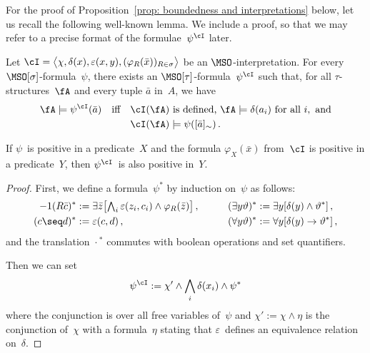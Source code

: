 \documentclass{LMCS}
\begin{document}
For the proof of Proposition~\ref{prop: boundedness and interpretations} below,
let us recall the following well-known lemma.
We include a proof, so that we may refer to a
precise format of the formulae~$\psi^\cI$ later.
\begin{lem}\label{lem:interpretations}
Let $\cI = \bigl\langle\chi, \delta(x),\varepsilon(x,y),(\varphi_R(\bar x))_{R \in \sigma}\bigr\rangle$
be an $\MSO$-interpretation.
For every $\MSO[\sigma]$-formula~$\psi$,
there exists an $\MSO[\tau]$-formula~$\psi^\cI$ such that,
for all $\tau$-structures~$\fA$ and every tuple $\bar a$ in~$A$, we have
\begin{align*}
  \fA \models \psi^\cI(\bar a)
  \quad\text{iff}\quad
  &\cI(\fA) \text{ is defined, }
    \fA \models \delta(a_i) \text{ for all } i, \text{ and}\\
  &\cI(\fA) \models \psi([\bar a]_\sim)\,. 
\end{align*}

If $\psi$~is positive in a predicate~$X$ and the
formula $\varphi_X(\bar x)$ from~$\cI$ is positive
in a predicate~$Y$, then $\psi^\cI$~is also positive in~$Y$.
\end{lem}
\begin{proof}
First, we define a formula~$\psi^*$ by induction on~$\psi$ as follows\?:
\begin{alignat*}{-1}
  (R\bar c)^* &:= \textstyle\exists\bar z\bigl[\bigwedge_i \varepsilon(z_i, c_i) \land \varphi_R(\bar z)\bigr]\,,
  &\qquad
  (\exists y\vartheta)^* &:= \exists y[\delta(y) \land \vartheta^*]\,, \\
  (c\seq d)^* &:= \varepsilon(c,d)\,,
  &\qquad
  (\forall y\vartheta)^* &:= \forall y[\delta(y) \to \vartheta^*]\,,
\end{alignat*}
and the translation ${}\cdot{}^*$ commutes with boolean operations and set quantifiers.

Then we can set
\begin{align*}
  \psi^\cI := \chi' \land \bigwedge_i \delta(x_i) \land \psi^*
\end{align*}
where
the conjunction is over all free variables of~$\psi$ and
$\chi' := \chi \land \eta$ is the conjunction of~$\chi$ with a formula~$\eta$ stating
that $\varepsilon$~defines an equivalence relation on~$\delta$.
\end{proof}
\end{document}
